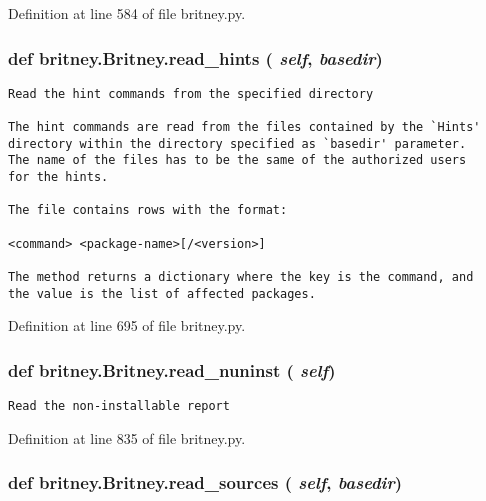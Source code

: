 Definition at line 584 of file britney.py.
\subsubsection{\setlength{\rightskip}{0pt plus 5cm}def britney.Britney.read\_\-hints ( {\em self},  {\em basedir})}\label{classbritney_1_1Britney_46d535f617fcf1faaaf5d841ea23c184}




\footnotesize\begin{verbatim}Read the hint commands from the specified directory

The hint commands are read from the files contained by the `Hints'
directory within the directory specified as `basedir' parameter. 
The name of the files has to be the same of the authorized users
for the hints.

The file contains rows with the format:

<command> <package-name>[/<version>]

The method returns a dictionary where the key is the command, and
the value is the list of affected packages.
\end{verbatim}
\normalsize
 

Definition at line 695 of file britney.py.
\subsubsection{\setlength{\rightskip}{0pt plus 5cm}def britney.Britney.read\_\-nuninst ( {\em self})}\label{classbritney_1_1Britney_24fe2c117eadac8eb783e3cb86300265}




\footnotesize\begin{verbatim}Read the non-installable report\end{verbatim}
\normalsize
 

Definition at line 835 of file britney.py.
\subsubsection{\setlength{\rightskip}{0pt plus 5cm}def britney.Britney.read\_\-sources ( {\em self},  {\em basedir})}\label{classbritney_1_1Britney_054f44c47f17c0c4f5a069e821b7f868}




